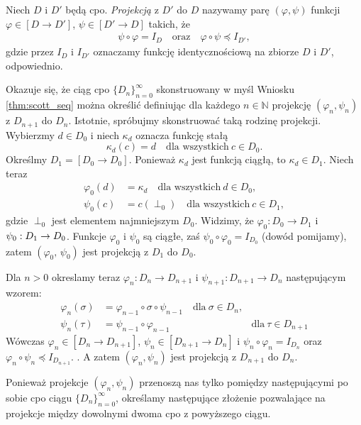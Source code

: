 \begin{definicja}[Projekcja]%
Niech \(D\) i \(D'\) będą cpo. \emph{Projekcją} z \(D'\) do \(D\) nazywamy parę \((\varphi, \psi)\) funkcji \(\varphi \in [D\to D']\), \(\psi \in [D'\to D]\) takich, że
\begin{align}
\psi\circ \varphi = I_D\quad \text{oraz}\quad \varphi\circ \psi \preceq I_{D'} \tag{\textasteriskcentered},
\end{align}
gdzie przez \(I_D\) i \(I_{D'}\) oznaczamy funkcję identycznościową na zbiorze \(D\) i \(D'\), odpowiednio.
\end{definicja}


  Okazuje się, że ciąg cpo \(\{D_n\}_{n=0}^\infty\) skonstruowany w myśl Wniosku \ref{thm:scott_seq} można określić definiując dla każdego \(n\in\mathbb{N}\) projekcję \((\varphi_n,\psi_n)\) z \(D_{n+1}\) do \(D_n\). Istotnie, spróbujmy skonstruować taką rodzinę projekcji. Wybierzmy \(d\in D_0\) i niech \(\kappa_d\) oznacza funkcję stałą 
  \[\kappa_d(c)=d\quad \text{dla wszystkich}\ c\in D_0.\]
  Określmy \(D_1=[D_0\to D_0]\). Ponieważ \(\kappa_d\) jest funkcją ciągłą, to \(\kappa_d\in D_1\). Niech teraz
  \begin{align*}
    \varphi_0 (d) &= \kappa_d  \quad \text{dla wszystkich}\ d\in D_0,\\
    \psi_0(c) &= c(\perp_0) \quad \text{dla wszystkich}\ c\in D_1,
  \end{align*}
gdzie \(\perp_0\) jest elementem najmniejszym \(D_0\). Widzimy, że \(\varphi_0: D_0 \to D_1\) i \(\psi_0:\nobreak D_1\to\nobreak D_0\). Funkcje \(\varphi_0\) i \(\psi_0\) są ciągłe, zaś \(\psi_0\circ\varphi_0 = I_{D_0}\) (dowód pomijamy), zatem \((\varphi_0,\,\psi_0)\) jest projekcją z \(D_1\) do \(D_0\).

Dla \(n>0\) okreslamy teraz \(\varphi_n : D_n \to D_{n+1}\) i \(\psi_{n+1}: D_{n+1}\to D_n\) następującym wzorem:
\begin{align*}
  \varphi_n(\sigma) &= \varphi_{n-1}\circ\sigma\circ\psi_{n-1}\quad \text{dla}\ \sigma\in D_n,\\ 
  \psi_n(\tau) &= \psi_{n-1}\circ\varphi_{n-1}\quad &\text{dla}\ \tau \in D_{n+1}
\end{align*}
Wówczas \(\varphi_n\in[D_n\to D_{n+1}]\), \(\psi_n\in[D_{n+1}\to D_n]\) i \(\psi_n\circ\varphi_n=I_{D_n}\) oraz \(\varphi_n\circ\psi_n\preceq I_{D_{n+1}}.\) \cite[Lemat 16.28]{Hindley:2008:LCI:1388400}. A zatem \((\varphi_n,\psi_n)\) jest projekcją z \(D_{n+1}\) do \(D_n\).

Ponieważ projekcje \((\varphi_n, \psi_n)\) przenoszą nas tylko pomiędzy następującymi po sobie cpo ciągu \(\{D_n\}_{n=0}^\infty\), określamy następujące złożenie pozwalające na projekcje między dowolnymi dwoma cpo z powyższego ciągu.

